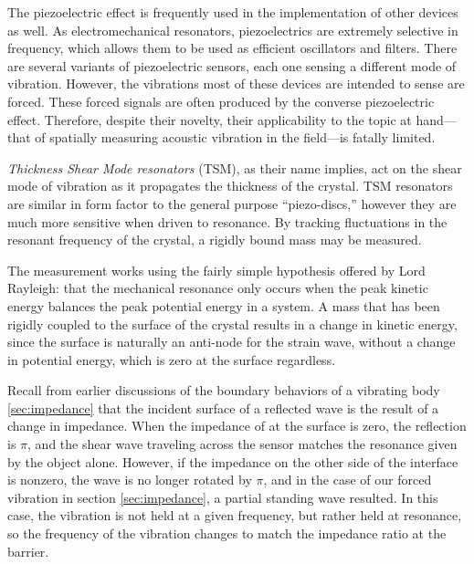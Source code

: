 \documentclass[a4paper,10pt]{report}
\numberwithin{equation}{section}
\begin{document}
{\begin{section}
\par
The piezoelectric effect is frequently used in the implementation of other devices as well. As electromechanical resonators, piezoelectrics are extremely selective in frequency, which allows them to be used as efficient oscillators and filters. \cite[p.~27]{Kino1987} There are several variants of piezoelectric sensors, each one sensing a different mode of vibration. However, the vibrations most of these devices are intended to sense are forced. These forced signals are often produced by the converse piezoelectric effect. \cite[p.~154]{Cremer1973} Therefore, despite their novelty, their applicability to the topic at hand---that of spatially measuring acoustic vibration in the field---is fatally limited.
\par
\emph{Thickness Shear Mode resonators} (TSM), as their name implies, act on the shear mode of vibration as it propagates the thickness of the crystal. TSM resonators are similar in form factor to the general purpose ``piezo-discs,'' however they are much more sensitive when driven to resonance. By tracking fluctuations in the resonant frequency of the crystal, a rigidly bound mass may be measured. \cite[p.~37]{Ballantine1997}
\par
The measurement works using the fairly simple hypothesis offered by Lord Rayleigh: that the mechanical resonance only occurs when the peak kinetic energy balances the peak potential energy in a system. A mass that has been rigidly coupled to the surface of the crystal results in a change in kinetic energy, since the surface is naturally an anti-node for the strain wave, without a change in potential energy, which is zero at the surface regardless. \cite[p.~43]{Ballantine1997} 
\par
Recall from earlier discussions of the boundary behaviors of a vibrating body \ref{sec:impedance} that the incident surface of a reflected wave is the result of a change in impedance. When the impedance of at the surface is zero, the reflection is $\pi$, and the shear wave traveling across the sensor matches the resonance given by the object alone. However, if the impedance on the other side of the interface is nonzero, the wave is no longer rotated by $\pi$, and in the case of our forced vibration in section \ref{sec:impedance}, a partial standing wave resulted. \cite[p.~119]{Cremer1973} In this case, the vibration is not held at a given frequency, but rather held at resonance, so the frequency of the vibration changes to match the impedance ratio at the barrier. 
\par

\end{section}}
\end{document}
